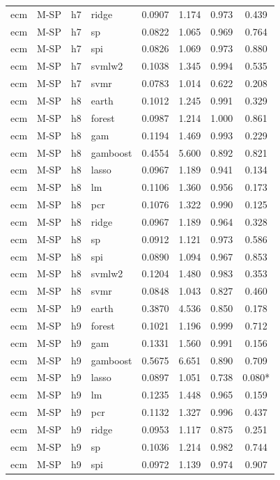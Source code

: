 \begin{ThreePartTable}
\begin{longtable}[t]{llclcccc}
ecm & M-SP & h7 & ridge & 0.0907 & 1.174 & 0.973 & 0.439\\
ecm & M-SP & h7 & sp & 0.0822 & 1.065 & 0.969 & 0.764\\
ecm & M-SP & h7 & spi & 0.0826 & 1.069 & 0.973 & 0.880\\
ecm & M-SP & h7 & svmlw2 & 0.1038 & 1.345 & 0.994 & 0.535\\
ecm & M-SP & h7 & svmr & 0.0783 & 1.014 & 0.622 & 0.208\\
\addlinespace
ecm & M-SP & h8 & earth & 0.1012 & 1.245 & 0.991 & 0.329\\
ecm & M-SP & h8 & forest & 0.0987 & 1.214 & 1.000 & 0.861\\
ecm & M-SP & h8 & gam & 0.1194 & 1.469 & 0.993 & 0.229\\
ecm & M-SP & h8 & gamboost & 0.4554 & 5.600 & 0.892 & 0.821\\
ecm & M-SP & h8 & lasso & 0.0967 & 1.189 & 0.941 & 0.134\\
ecm & M-SP & h8 & lm & 0.1106 & 1.360 & 0.956 & 0.173\\
ecm & M-SP & h8 & pcr & 0.1076 & 1.322 & 0.990 & 0.125\\
ecm & M-SP & h8 & ridge & 0.0967 & 1.189 & 0.964 & 0.328\\
ecm & M-SP & h8 & sp & 0.0912 & 1.121 & 0.973 & 0.586\\
ecm & M-SP & h8 & spi & 0.0890 & 1.094 & 0.967 & 0.853\\
ecm & M-SP & h8 & svmlw2 & 0.1204 & 1.480 & 0.983 & 0.353\\
ecm & M-SP & h8 & svmr & 0.0848 & 1.043 & 0.827 & 0.460\\
\addlinespace
ecm & M-SP & h9 & earth & 0.3870 & 4.536 & 0.850 & 0.178\\
ecm & M-SP & h9 & forest & 0.1021 & 1.196 & 0.999 & 0.712\\
ecm & M-SP & h9 & gam & 0.1331 & 1.560 & 0.991 & 0.156\\
ecm & M-SP & h9 & gamboost & 0.5675 & 6.651 & 0.890 & 0.709\\
ecm & M-SP & h9 & lasso & 0.0897 & 1.051 & 0.738 & 0.080*\\
ecm & M-SP & h9 & lm & 0.1235 & 1.448 & 0.965 & 0.159\\
ecm & M-SP & h9 & pcr & 0.1132 & 1.327 & 0.996 & 0.437\\
ecm & M-SP & h9 & ridge & 0.0953 & 1.117 & 0.875 & 0.251\\
ecm & M-SP & h9 & sp & 0.1036 & 1.214 & 0.982 & 0.744\\
ecm & M-SP & h9 & spi & 0.0972 & 1.139 & 0.974 & 0.907\\

\end{longtable}
\end{ThreePartTable}
